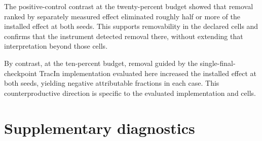 \documentclass[10pt]{article}
\begin{document}
The positive-control contrast at the twenty-percent budget showed that removal ranked by separately measured effect eliminated roughly half or more of the installed effect at both seeds. This supports removability in the declared cells and confirms that the instrument detected removal there, without extending that interpretation beyond those cells.



By contrast, at the ten-percent budget, removal guided by the single-final-checkpoint TracIn implementation evaluated here increased the installed effect at both seeds, yielding negative attributable fractions in each case. This counterproductive direction is specific to the evaluated implementation and cells.







\appendix
\section{Supplementary diagnostics}
\end{document}
